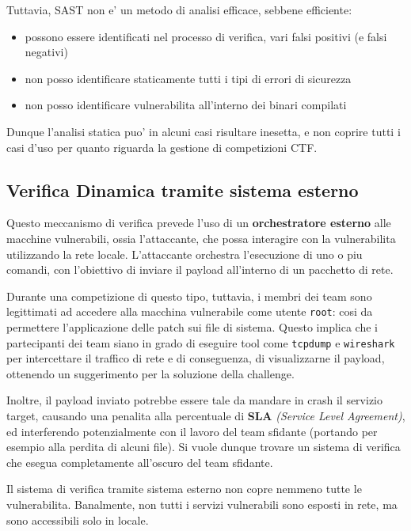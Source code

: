 Tuttavia, SAST non e' un metodo di analisi efficace, sebbene efficiente:

\begin{itemize}
\tightlist
\item
  possono essere identificati nel processo di verifica, vari falsi
  positivi (e falsi negativi)
\item
  non posso identificare staticamente tutti i tipi di errori di
  sicurezza 
\item
  non posso identificare vulnerabilita all'interno dei binari
  compilati
\end{itemize}

Dunque l'analisi statica puo' in alcuni casi risultare inesetta, e non
coprire tutti i casi d'uso per quanto riguarda la gestione di
competizioni CTF.

\subsection{Verifica Dinamica tramite sistema
esterno}\label{verifica-dinamica-tramite-sistema-esterno}

Questo meccanismo di verifica prevede l'uso di un \textbf{orchestratore
esterno} alle macchine vulnerabili, ossia l'attaccante, che possa
interagire con la vulnerabilita utilizzando la rete locale. L'attaccante
orchestra l'esecuzione di uno o piu comandi, con l'obiettivo di inviare
il payload all'interno di un pacchetto di rete.

Durante una competizione di questo tipo, tuttavia, i membri dei team
sono legittimati ad accedere alla macchina vulnerabile come utente
\passthrough{\lstinline!root!}: cosi da permettere l'applicazione delle
patch sui file di sistema. Questo implica che i partecipanti dei team
siano in grado di eseguire tool come \passthrough{\lstinline!tcpdump!} e
\passthrough{\lstinline!wireshark!} per intercettare il traffico di rete
e di conseguenza, di visualizzarne il payload, ottenendo un suggerimento
per la soluzione della challenge.

Inoltre, il payload inviato potrebbe essere tale da mandare in crash il
servizio target, causando una penalita alla percentuale di \textbf{SLA}
\emph{(Service Level Agreement)}, ed interferendo potenzialmente con il
lavoro del team sfidante (portando per esempio alla perdita di alcuni
file). Si vuole dunque trovare un sistema di verifica che esegua
completamente all'oscuro del team sfidante.

Il sistema di verifica tramite sistema esterno non copre nemmeno tutte
le vulnerabilita. Banalmente, non tutti i servizi vulnerabili sono
esposti in rete, ma sono accessibili solo in locale.

